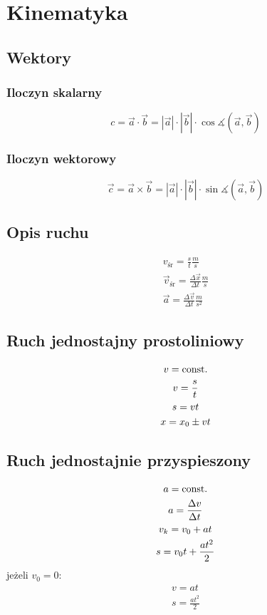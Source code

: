 \chapter{Kinematyka}

\section{Wektory}

\subsection{Iloczyn skalarny}
\begin{equation}
  c = \vec a \cdot \vec b = |\vec a| \cdot |\vec b| \cdot \cos\measuredangle(\vec a, \vec b)
\end{equation}

\subsection{Iloczyn wektorowy}
\begin{equation}
  \vec c = \vec a \times \vec b =|\vec a| \cdot |\vec b| \cdot \sin\measuredangle(\vec a, \vec b)
\end{equation}

\section{Opis ruchu}
\begin{gather*}
  v_\text{śr} = \frac s t \unit{\frac m s}\\
  \vec v_\text{śr} = \frac{\Delta \vec x}{\Delta t} \unit{\frac m s}\\
  \vec a = \frac{\Delta \vec v}{\Delta t} \unit{\frac{m}{s^2}}
\end{gather*}

\section{Ruch jednostajny prostoliniowy}
\begin{gather*}
  v = \operatorname{const.}\\
  v = \frac s t\\
  s = vt\\
  x = x_0 \pm vt
\end{gather*}

\section{Ruch jednostajnie przyspieszony}
\begin{gather*}
  a = \operatorname{const.}\\
  a = \frac{\Delta v}{\Delta t}\\
  v_k = v_0 + at\\
  s = v_0 t + \frac{a t^2}{2}
\end{gather*}
jeżeli $v_0 = 0$:
\begin{gather*}
  v = at\\
  s = \frac{a t^2}{2}
\end{gather*}

